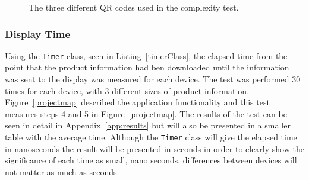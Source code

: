 	\begin{figure}[H]%
		\centering
   		 \qquad
   		 \qquad
   		 \qquad
		\caption{The three different QR codes used in the complexity test.}
		\label{qrCodeComplex}
	\end{figure}

%       
%		

\subsubsection{Display Time}

Using the \texttt{Timer} class, seen in Listing~\ref{timerClass}, the elapsed time from the point that the product information had ben downloaded until the information was sent to the display was measured for each device. The test was performed 30 times for each device, with 3 different sizes of product information. Figure~\ref{projectmap} described the application functionality and this test measures steps 4 and 5 in Figure~\ref{projectmap}. The results of the test can be seen in detail in Appendix~\ref{app:results} but will also be presented in a smaller table with the average time. %
Although the \texttt{Timer} class will give the elapsed time in nanoseconds the result will be presented in seconds in order to clearly show the significance of each time as small, nano seconds, differences between devices will not matter as much as seconds.

